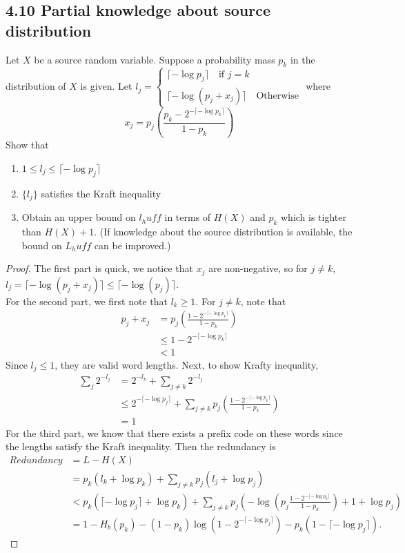 \documentclass[../main.tex]{subfiles}
\begin{document}
 \subsection*{4.10 Partial knowledge about source distribution}
 Let $X$ be a source random variable. Suppose a probability mass $p_k$ in the distribution of $X$ is given. Let $l_j  =\begin{cases}
     \lceil{-\log p_j}\rceil  \quad \text{if $j=k$}\\
     \lceil-\log(p_j+x_j)\rceil
     \quad\text{Otherwise}
     
 \end{cases}$
 where \[
 x_j = p_j(\frac{p_k-2^{-\lceil-\log p_k\rceil}}{1-p_k})
 \] 
 Show that \begin{enumerate}
     \item $1\leq l_j\leq \lceil{-\log p_j}\rceil$
     \item $\{l_j\}$ satisfies the Kraft inequality
     \item Obtain an upper bound on $l_huff$ in terms of $H(X)$ and $p_k$ which is tighter than $H(X)+1$. (If knowledge about the source distribution is available, the bound on $L_huff$ can be improved.)
 \end{enumerate}
 \begin{proof}
     The first part is quick, we notice that $x_j$ are non-negative, so for $j\neq k$, $l_j=\lceil-\log(p_j+x_j)\rceil\leq \lceil-\log(p_j)\rceil$.\\
     For the second part, we first note that $l_k\geq 1$. For $j\neq k$, note that \begin{align*}
         p_j+x_j &= p_j(\frac{1-2^{-\lceil-\log p_k\rceil}}{1-p_k})\\
         &\leq 1-2^{-\lceil-\log p_k\rceil}\\
         & < 1
     \end{align*}
     Since $l_j \leq 1$, they are valid word lengths. Next, to show Krafty inequality, \begin{align*}
         \sum_j 2^{-l_j} &= 2^{-l_k} + \sum_{j\neq k}2^{-l_j}\\
         &\leq 2^{-\lceil{-\log p_j}\rceil} + \sum_{j\neq k}p_j(\frac{1-2^{-\lceil-\log p_k\rceil}}{1-p_k})\\
         &=1
     \end{align*}
     For the third part, we know that there exists a prefix code on these words since the lengths satisfy the Kraft inequality. Then the redundancy is \begin{align*}
         Redundancy &= L- H(X)\\
         &= p_k(l_k+\log p_k) + \sum_{j\neq k}p_j(l_j+\log p_j)\\
         &< p_k(\lceil{-\log p_j}\rceil+\log p_k) + \sum_{j\neq k}p_j(-\log(p_j\frac{1-2^{-\lceil-\log p_k\rceil}}{1-p_k})+1 +\log p_j)\\
         &= 1-H_b(p_k)-(1-p_k)\log(1-2^{-\lceil{-\log p_j}\rceil}) - p_k(1-\lceil{-\log p_j}\rceil).
     \end{align*}
 \end{proof}
\end{document}
